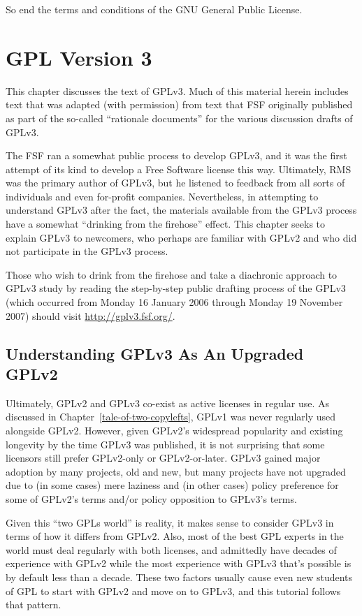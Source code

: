 So end the terms and conditions of the GNU General Public License.

\chapter{GPL Version 3}
\label{GPLv3}

This chapter discusses the text of GPLv3.  Much of this material herein
includes text that was adapted (with permission) from text that FSF
originally published as part of the so-called ``rationale documents'' for the
various discussion drafts of GPLv3.

The FSF ran a somewhat public process to develop GPLv3, and it was the first
attempt of its kind to develop a Free Software license this way.  Ultimately,
RMS was the primary author of GPLv3, but he listened to feedback from all
sorts of individuals and even for-profit companies.  Nevertheless, in
attempting to understand GPLv3 after the fact, the materials available from
the GPLv3 process have a somewhat ``drinking from the firehose'' effect.
This chapter seeks to explain GPLv3 to newcomers, who perhaps are familiar
with GPLv2 and who did not participate in the GPLv3 process.

Those who wish to drink from the firehose and take a diachronic approach to
GPLv3 study by reading the step-by-step public drafting process of the GPLv3 (which
occurred from Monday 16 January 2006 through Monday 19 November 2007) should
visit \url{http://gplv3.fsf.org/}.

\section{Understanding GPLv3 As An Upgraded GPLv2}

Ultimately, GPLv2 and GPLv3 co-exist as active licenses in regular use.  As
discussed in Chapter~\ref{tale-of-two-copylefts}, GPLv1 was never regularly
used alongside GPLv2.  However, given GPLv2's widespread popularity and
existing longevity by the time GPLv3 was published, it is not surprising that
some licensors still prefer GPLv2-only or GPLv2-or-later.  GPLv3 gained major
adoption by many projects, old and new, but many projects have not upgraded
due to (in some cases) mere laziness and (in other cases) policy preference
for some of GPLv2's terms and/or policy opposition to GPLv3's terms.

Given this ``two GPLs world'' is reality, it makes sense to consider GPLv3 in
terms of how it differs from GPLv2.  Also, most of the best GPL experts in
the world must deal regularly with both licenses, and admittedly have decades
of experience with GPLv2 while the most experience with GPLv3 that's possible
is by default less than a decade.  These two factors usually cause even new
students of GPL to start with GPLv2 and move on to GPLv3, and this tutorial
follows that pattern.

